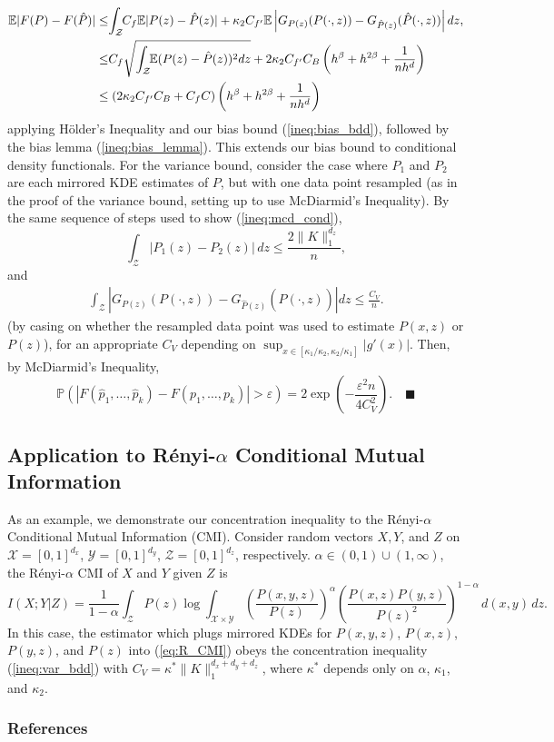 \documentclass{article} %
\renewcommand{\qed}{\quad \ensuremath{\blacksquare}}    %
\newcommand{\e}{\varepsilon}                        %
\newcommand{\X}{\mathcal{X}}                        %
\newcommand{\Y}{\mathcal{Y}}                        %
\newcommand{\Z}{\mathcal{Z}}                        %
\newcommand{\E}{\mathbb{E}}                         %
\begin{document}
\begin{align*}
\E|F(P) - F(\hat P)|
 &  \leq \hspace{-1mm}\int_\Z\hspace{-1mm}C_f \E |P(z) - \hat P(z)|
    + \kappa_2 C_{f'} \E \left| G_{P(z)}(P(\cdot,z)) - G_{\hat P(z)}(\hat
P(\cdot,z)) \right| dz, \\
 &  \leq \hspace{-1mm}C_f\sqrt{\int_\Z\hspace{-1mm} \E (P(z) - \hat P(z))^2 dz}
    + 2\kappa_2 C_{f'} C_B \left( h^\beta + h^{2\beta} + \frac{1}{nh^d} \right) \\
 &  \leq (2\kappa_2 C_{f'} C_B + C_fC)\left( h^\beta + h^{2\beta} + \frac{1}{nh^d} \right)
\end{align*}
applying H\"older's Inequality and our bias bound (\ref{ineq:bias_bdd}),
followed by the bias lemma (\ref{ineq:bias_lemma}). This extends our bias bound
to conditional density functionals. For the variance bound, consider the case
where $P_1$ and $P_2$ are each mirrored KDE estimates of $P$, but with one data
point resampled (as in the proof of the variance bound, setting up to use
McDiarmid's Inequality). By the same sequence of steps used to show
(\ref{ineq:mcd_cond}),
\[\int_\Z |P_1(z) - P_2(z)| \, dz \leq \frac{2\|K\|_1^{d_z}}{n},\]
and
\begin{align*}
\int_\Z \left| G_{P(z)}(P(\cdot,z)) - G_{\hat P(z)}(\hat P(\cdot,z)) \right| dz
    \leq \frac{C_V}{n}.
\end{align*}
(by casing on whether the resampled data point was used to estimate $P(x,z)$ or
$P(z)$), for an appropriate $C_V$ depending on
$\sup_{x \in [\kappa_1/\kappa_2,\kappa_2/\kappa_1]} |g'(x)|$.
Then, by McDiarmid's Inequality,
\[\mathbb{P}\left( |F(\hat p_1,\dots,\hat p_k) - F(p_1,\dots,p_k)| > \e \right)
    = 2\exp\left( -\frac{\e^2n}{4C_V^2} \right). \qed
\]

\subsection{Application to R\'enyi-$\alpha$ Conditional Mutual Information}
As an example, we demonstrate our concentration inequality to the R\'enyi-$\alpha$
Conditional Mutual Information (CMI). Consider random vectors $X,Y$, and $Z$ on
$\X = [0,1]^{d_x}$, $\Y = [0,1]^{d_y}$, $\Z = [0,1]^{d_z}$, respectively.
$\alpha \in (0,1) \cup (1,\infty)$, the R\'enyi-$\alpha$ CMI of $X$ and $Y$
given $Z$ is
\begin{equation}
I(X; Y | Z)
    = \frac{1}{1 - \alpha} \int_\Z P(z) \log
            \int_{\X \times \Y} \left( \frac{P(x,y,z)}{P(z)} \right)^\alpha
            \left( \frac{P(x,z)P(y,z)}{P(z)^2} \right)^{1 - \alpha} \, d(x,y)
      \, dz.
\label{eq:R_CMI}
\end{equation}
In this case, the estimator which plugs mirrored KDEs for $P(x,y,z)$, $P(x,z)$,
$P(y,z)$, and $P(z)$ into (\ref{eq:R_CMI}) obeys the concentration inequality
(\ref{ineq:var_bdd}) with $C_V = \kappa^*\|K\|_1^{d_x + d_y + d_z}$, where
$\kappa^*$ depends only on $\alpha$, $\kappa_1$, and $\kappa_2$.

\subsubsection*{References}
\setlength{\bibsep}{0.0pt}
{


}
\end{document}
